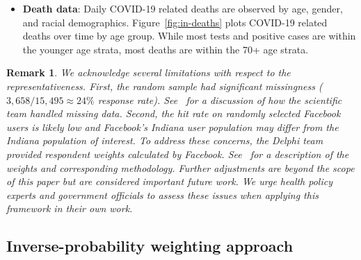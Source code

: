 \documentclass[11pt]{amsart}
\numberwithin{equation}{section}
\theoremstyle{plain}
\newtheorem{remark}{Remark}
\begin{document}
\begin{itemize}[leftmargin=*]

 \item {\bf Death data}: Daily COVID-19 related deaths are observed by age, gender, and racial demographics.  Figure~\ref{fig:in-deaths} plots COVID-19 related deaths over time by age group. While most tests and positive cases are within the younger age strata, most deaths are within the 70+ age strata.
 \end{itemize}

\begin{remark}
 We acknowledge several limitations with respect to the representativeness.  First, the random sample had significant missingness ($3,658/15,495 \approx 24\%$ response rate). See~\cite{Yiannoutsos2021} for a discussion of how the scientific team handled missing data. Second, the hit rate on randomly selected Facebook users is likely low and Facebook's Indiana user population may differ from the Indiana population of interest.  To address these concerns, the Delphi team provided respondent weights calculated by Facebook.  See~\cite{Barkay2020} for a description of the weights and corresponding methodology.  Further adjustments are beyond the scope of this paper but are considered important future work. We urge health policy experts and government officials to assess these issues when applying this framework in their own work.
 \end{remark}


 \subsection{Inverse-probability weighting approach}
 \label{section:ipwapproach}

\end{document}
